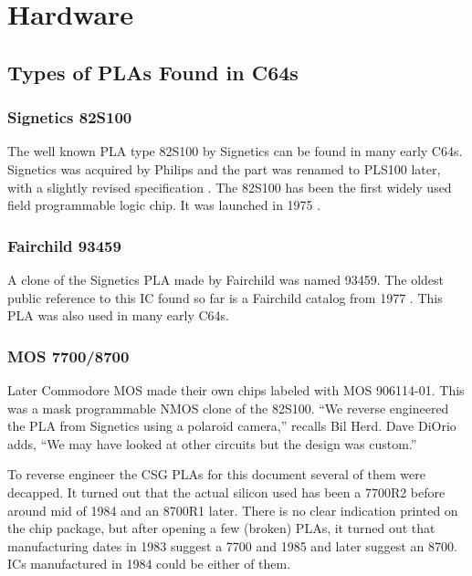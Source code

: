 \chapter{Hardware}
\label{sec:hardware}

\section{Types of PLAs Found in C64s}

\subsection{Signetics 82S100}

The well known PLA type 82S100 by Signetics \cite{Si75} can be found in
many early C64s. Signetics was acquired by Philips and the part was renamed
to PLS100 later, with a slightly revised specification \cite{PLS100}. The
82S100 has been the first widely used field programmable logic chip. It was
launched in 1975 \cite{CHM09}.

\subsection{Fairchild 93459}

A clone of the Signetics PLA made by Fairchild was named 93459. The oldest
public reference to this IC found so far is a Fairchild catalog from 1977
\cite{Fc77}. This PLA was also used in many early C64s.


\subsection{MOS 7700/8700}

Later Commodore MOS made their own chips labeled with MOS 906114-01. This
was a mask programmable NMOS clone of the 82S100. ``We reverse
engineered the PLA from Signetics using a polaroid camera,'' recalls Bil
Herd. Dave DiOrio adds, ``We may have looked at other circuits but the
design was custom.''

To reverse engineer the CSG PLAs for this document several of them were
decapped. It turned out that the actual silicon used has been a 7700R2
before around mid of 1984 and an 8700R1 later. There is no clear indication
printed on the chip package, but after opening a few (broken) PLAs, it
turned out that manufacturing dates in 1983 suggest a 7700 and 1985 and later
suggest an 8700. ICs manufactured in 1984 could be either of them.

